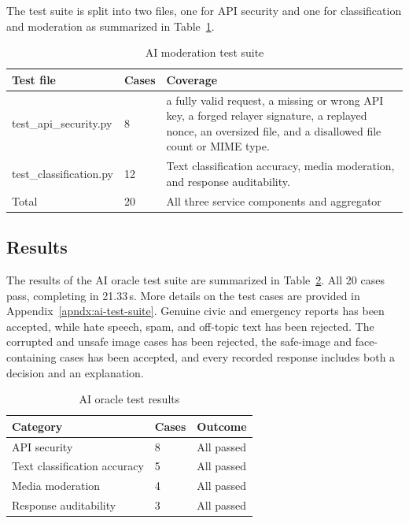 \begin{table}[htbp]
\centering
\caption{AI moderation test suite}
The test suite is split into two files, one for API security and one for classification and moderation as summarized in Table~\ref{tab:ai-test-suite}. 

\label{tab:ai-test-suite}
\begin{tabular}{p{}|p{}|p{}}
    
    Test file & Cases & Coverage \\
    \hline
    {test\_api\_security.py} & 8 & a fully valid request, a missing or wrong API key, a forged relayer signature, a replayed nonce, an oversized file, and a disallowed file count or MIME type.\\
    \hline
    {test\_classification.py} & 12 & Text classification accuracy, media moderation, and response auditability. \\
    \hline
    Total & 20 & All three service components and aggregator \\
    
\end{tabular}
\end{table}


\subsection{Results}

The results of the AI oracle test suite are summarized in Table~\ref{tab:ai-results}. All 20 cases pass, completing in 21.33\,s. More details on the test cases are provided in Appendix~\ref{apndx:ai-test-suite}. Genuine civic and emergency reports has been accepted, while hate speech, spam, and off-topic text has been rejected. The corrupted and unsafe image cases has been rejected, the safe-image and face-containing cases has been accepted, and every recorded response includes both a decision and an explanation. 

\begin{table}[htbp]
\centering
\caption{AI oracle test results}
\label{tab:ai-results}
\begin{tabular}{p{}|p{}|p{}}
    
    Category & Cases & Outcome \\
    \hline
    API security & 8 & All passed \\
    \hline
    Text classification accuracy & 5 & All passed \\
    \hline
    Media moderation & 4 & All passed \\
    \hline
    Response auditability & 3 & All passed \\
    
\end{tabular}
\end{table}

